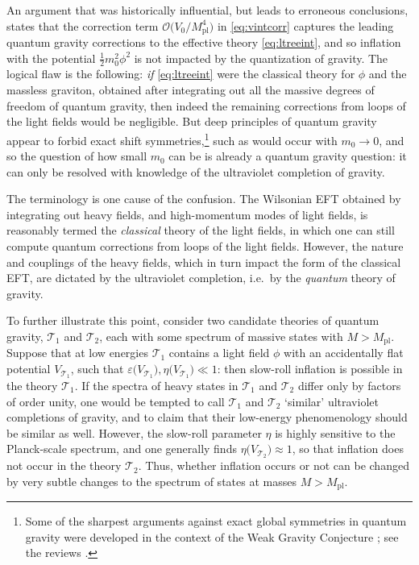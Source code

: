 \documentclass[12pt,a4wide]{article}
\begin{document}
An argument that was historically influential, but leads to erroneous conclusions, states that the correction term $\mathcal{O}\bigl(V_0/M_{\text{pl}}^4\bigr)$ in \eqref{eq:vintcorr} captures the leading quantum gravity corrections to the effective theory \eqref{eq:ltreeint}, and so inflation with the potential $\frac{1}{2}m_0^2\phi^2$ is not impacted by the quantization of gravity.
The logical flaw is the following: \emph{if} \eqref{eq:ltreeint} were the classical theory for $\phi$ and the massless graviton, obtained after integrating out all the massive degrees of freedom of quantum gravity, then indeed the remaining corrections from loops of the light fields would be negligible.  But deep principles of quantum gravity appear to forbid exact shift symmetries,\footnote{Some of the sharpest arguments against exact global symmetries in quantum gravity were developed in the context of the Weak Gravity Conjecture \cite{Arkani-Hamed:2006emk}; see the reviews \cite{Palti:2019pca,vanBeest:2021lhn,Agmon:2022thq,Harlow:2022ich}.} such as would occur with $m_0 \to 0$, and so the question of how small $m_0$ can be is  already a quantum gravity question: it can only be resolved with knowledge of the ultraviolet completion of gravity.

The terminology is one cause of the confusion.  The Wilsonian EFT obtained by integrating out heavy fields, and high-momentum modes of light fields, is reasonably termed the \emph{classical}  theory of the light fields, in which one can still compute quantum corrections from loops of the light fields.  However, the nature and couplings of the heavy fields, which in turn impact the form of the classical EFT, are dictated by the ultraviolet completion, i.e.~by the \emph{quantum}  theory of gravity.

To further illustrate this point, consider two candidate theories of quantum gravity, $\mathscr{T}_1$ and $\mathscr{T}_2$, each with some spectrum of massive states with $M>M_{\text{pl}}$.  Suppose that at low energies $\mathscr{T}_1$ contains a light field $\phi$ with an accidentally flat potential $V_{\mathscr{T}_1}$, such that
$\varepsilon\bigl(V_{\mathscr{T}_1}\bigr), \eta\bigl(V_{\mathscr{T}_1}\bigr) \ll 1$: then slow-roll inflation is possible in the theory $\mathscr{T}_1$.
If the spectra of heavy states in $\mathscr{T}_1$ and $\mathscr{T}_2$ differ only by factors of order unity, one would be tempted to call  $\mathscr{T}_1$ and $\mathscr{T}_2$ `similar' ultraviolet completions of gravity, and to claim that their low-energy phenomenology should be similar as well.   However, the slow-roll parameter $\eta$ is highly sensitive to the Planck-scale spectrum, and one generally finds $\eta\bigl(V_{\mathscr{T}_2}\bigr) \approx 1$, so that inflation does not occur in the theory $\mathscr{T}_2$.
Thus, whether inflation occurs or not can be changed by very subtle changes to the spectrum of states at masses $M > M_{\text{pl}}$.
\end{document}
